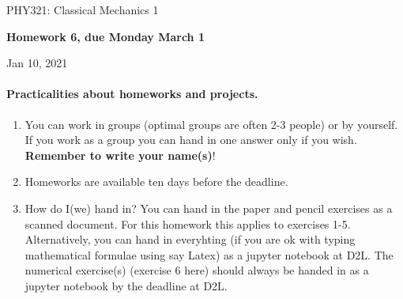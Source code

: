 \documentclass[%
oneside,                 %
final,                   %
10pt]{article}
\begin{document}

\newcommand{\exercisesection}[1]{\subsection*{#1}}






\thispagestyle{empty}

\begin{center}
{\LARGE\bf
\begin{spacing}{1.25}
PHY321: Classical Mechanics 1
\end{spacing}
}
\end{center}


\begin{center}
{\bf Homework 6, due Monday  March 1${}^{}$} \\ [0mm]
\end{center}

\begin{center}
\end{center}
    

\begin{center}
Jan 10, 2021
\end{center}

\vspace{1cm}


\paragraph{Practicalities about  homeworks and projects.}
\begin{enumerate}
\item You can work in groups (optimal groups are often 2-3 people) or by yourself. If you work as a group you can hand in one answer only if you wish. \textbf{Remember to write your name(s)}!

\item Homeworks are available ten days before the deadline.

\item How do I(we)  hand in?  You can hand in the paper and pencil exercises as a scanned document. For this homework this applies to exercises 1-5. Alternatively, you can hand in everyhting (if you are ok with typing mathematical formulae using say Latex) as a jupyter notebook at D2L. The numerical exercise(s) (exercise 6 here) should always be handed in as a jupyter notebook by the deadline at D2L. 
\end{enumerate}
\end{document}
